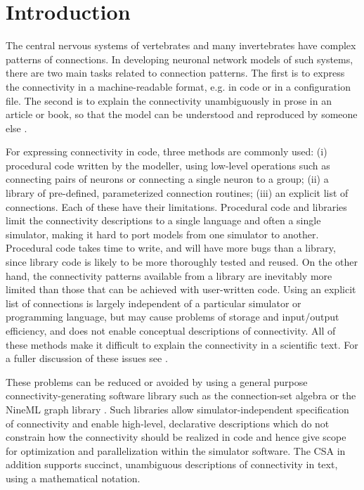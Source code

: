 \documentclass{frontiersSCNS} %
\begin{document}
\section{Introduction}

The central nervous systems of vertebrates and many invertebrates have
complex patterns of connections.  In developing neuronal network
models of such systems, there are two main tasks related to connection
patterns. The first is to express the connectivity in a
machine-readable format, e.g. in code or in a configuration file.  The
second is to explain the connectivity unambiguously in prose in an
article or book, so that the model can be understood and reproduced by
someone else \citep{nordlie-2009_e1000456}.

For expressing connectivity in code, three methods are commonly used:
(i) procedural code written by the modeller, using low-level
operations such as connecting pairs of neurons or connecting a single
neuron to a group; (ii) a library of pre-defined, parameterized
connection routines; (iii) an explicit list of connections.  Each of
these have their limitations.  Procedural code and libraries limit the
connectivity descriptions to a single language and often a single
simulator, making it hard to port models from one simulator to
another.  Procedural code takes time to write, and will have more bugs
than a library, since library code is likely to be more thoroughly
tested and reused.  On the other hand, the connectivity patterns
available from a library are inevitably more limited than those that
can be achieved with user-written code.  Using an explicit list of
connections is largely independent of a particular simulator or
programming language, but may cause problems of storage and
input/output efficiency, and does not enable conceptual descriptions
of connectivity.  All of these methods make it difficult to explain
the connectivity in a scientific text. For a fuller discussion of
these issues see \citet{crook12}.

These problems can be reduced or avoided by using a general purpose
connectivity-generating software library such as the connection-set
algebra \citep[CSA;][]{djurfeldt12} or the NineML graph library
\citep{raikov10}.  Such libraries allow simulator-independent
specification of connectivity and enable high-level, declarative
descriptions which do not constrain how the connectivity should be
realized in code and hence give scope for optimization and
parallelization within the simulator software.  The CSA in addition
supports succinct, unambiguous descriptions of connectivity in text,
using a mathematical notation.
\end{document}
